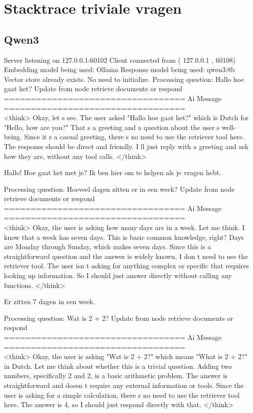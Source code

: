 \section{Stacktrace triviale vragen}
\label{stacktrace-triviale-vragen}


\subsection{Qwen3}
Server listening on 127.0.0.1:60102
Client connected from ( 127.0.0.1 , 60108)
Embedding model being used: Ollama
Response model being used: qwen3:8b
Vector store already exists. No need to initialize.
Processing question: Hallo hoe gaat het?
Update from node retrieve documents or respond
\\[1em]
================================== Ai Message ==================================
\\[1em]
<think>
Okay, let s see. The user asked "Hallo hoe gaat het?" which is Dutch for "Hello, how are you?" That s a greeting and a question about the user s well-being. Since it s a casual greeting, there s no need to use the retriever tool here. The response should be direct and friendly. I ll just reply with a greeting and ask how they are, without any tool calls.
</think>

Hallo! Hoe gaat het met je? Ik ben hier om te helpen als je vragen hebt.

Processing question: Hoeveel dagen zitten er in een week?
Update from node retrieve documents or respond
\\[1em]
================================== Ai Message ==================================
\\[1em]
<think>
Okay, the user is asking how many days are in a week. Let me think. I know that a week has seven days. This is basic common knowledge, right? Days are Monday through Sunday, which makes seven days. Since this is a straightforward question and the answer is widely known, I don t need to use the retriever tool. The user isn t asking for anything complex or specific that requires looking up information. So I should just answer directly without calling any functions.
</think>

Er zitten 7 dagen in een week.

Processing question: Wat is 2 + 2?
Update from node retrieve documents or respond
\\[1em]
================================== Ai Message ==================================
\\[1em]
<think>
Okay, the user is asking "Wat is 2 + 2?" which means "What is 2 + 2?" in Dutch. Let me think about whether this is a trivial question. Adding two numbers, specifically 2 and 2, is a basic arithmetic problem. The answer is straightforward and doesn t require any external information or tools. Since the user is asking for a simple calculation, there s no need to use the retriever tool here. The answer is 4, so I should just respond directly with that.
</think>

